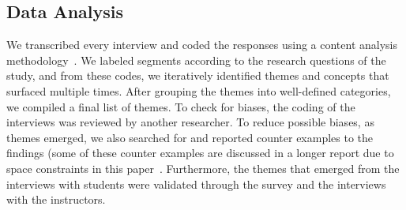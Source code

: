\subsection{Data Analysis}
We transcribed every interview and coded the responses using a content analysis methodology~\cite{charmaz2006constructing}.
We labeled segments according to the research questions of the study, and from these codes, we iteratively identified themes and concepts that surfaced multiple times. After grouping the themes into well-defined categories, we compiled a final list of themes. To check for biases, the coding of the interviews was reviewed by another researcher. To reduce possible biases, as themes emerged, we also searched for and reported counter examples to the findings (some of these counter examples are discussed in a longer report due to space constraints in this paper~\cite{feliciano2015towards}. Furthermore, the themes that emerged from the interviews with students were validated through the survey and the interviews with the instructors.
